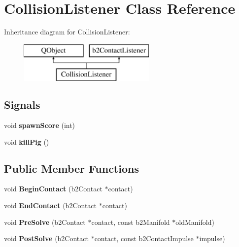 \hypertarget{classCollisionListener}{}\section{Collision\+Listener Class Reference}
\label{classCollisionListener}
Inheritance diagram for Collision\+Listener\+:\begin{figure}[H]
\begin{center}
\leavevmode
\includegraphics[height=2.000000cm]{classCollisionListener}
\end{center}
\end{figure}
\subsection*{Signals}
\begin{DoxyCompactItemize}
\item 
void {\bfseries spawn\+Score} (int)\hypertarget{classCollisionListener_ab470867a6bd34c86f96e17c393268bef}{}\label{classCollisionListener_ab470867a6bd34c86f96e17c393268bef}

\item 
void {\bfseries kill\+Pig} ()\hypertarget{classCollisionListener_a7de663bb56e4b2a63c8cd605166ec80a}{}\label{classCollisionListener_a7de663bb56e4b2a63c8cd605166ec80a}

\end{DoxyCompactItemize}
\subsection*{Public Member Functions}
\begin{DoxyCompactItemize}
\item 
void {\bfseries Begin\+Contact} (b2\+Contact $\ast$contact)\hypertarget{classCollisionListener_a0d57b91d91ad461f9cc555181209d911}{}\label{classCollisionListener_a0d57b91d91ad461f9cc555181209d911}

\item 
void {\bfseries End\+Contact} (b2\+Contact $\ast$contact)\hypertarget{classCollisionListener_ae1f187fd7825da08d601831534ab57a5}{}\label{classCollisionListener_ae1f187fd7825da08d601831534ab57a5}

\item 
void {\bfseries Pre\+Solve} (b2\+Contact $\ast$contact, const b2\+Manifold $\ast$old\+Manifold)\hypertarget{classCollisionListener_accc6ff23dcbf8cbef31e68fe3c56837a}{}\label{classCollisionListener_accc6ff23dcbf8cbef31e68fe3c56837a}

\item 
void {\bfseries Post\+Solve} (b2\+Contact $\ast$contact, const b2\+Contact\+Impulse $\ast$impulse)\hypertarget{classCollisionListener_a031bc60d472eb4c2996bfc2be6fbc83f}{}\label{classCollisionListener_a031bc60d472eb4c2996bfc2be6fbc83f}

\end{DoxyCompactItemize}


